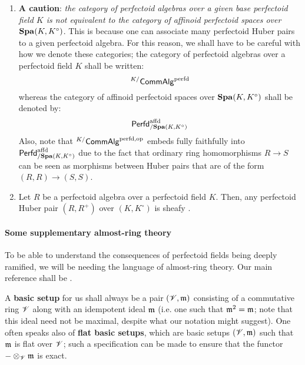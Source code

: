                     \begin{remark} \label{remark: perfectoid_affinoids}
                        \noindent
                        \begin{enumerate}
                            \item \textbf{A caution}: \textit{the category of perfectoid algebras over a given base perfectoid field $K$ is not equivalent to the category of affinoid perfectoid spaces over $\mathbf{Spa}(K, K^{\circ})$}. This is because one can associate many perfectoid Huber pairs to a given perfectoid algebra. For this reason, we shall have to be careful with how we denote these categories; the category of perfectoid algebras over a perfectoid field $K$ shall be written:
                                $${}^{K/}\mathsf{Comm}\mathsf{Alg}^{\mathrm{perfd}}$$
                            whereas the category of affinoid perfectoid spaces over $\mathbf{Spa}(K, K^{\circ})$ shall be denoted by:
                                $$\mathsf{Perfd}^{\mathrm{affd}}_{/\mathbf{Spa}(K, K^{\circ})}$$
                            Also, note that ${}^{K/}\mathsf{Comm}\mathsf{Alg}^{\mathrm{perfd}, \mathrm{op}}$ embeds fully faithfully into $\mathsf{Perfd}^{\mathrm{affd}}_{/\mathbf{Spa}(K, K^{\circ})}$ due to the fact that ordinary ring homomorphisms $R \to S$ can be seen as morphisms between Huber pairs that are of the form $(R, R) \to (S, S)$.
                            \item Let $R$ be a perfectoid algebra over a perfectoid field $K$. Then, any perfectoid Huber pair $(R, R^+)$ over $(K, K^{\circ})$ is sheafy \cite[Theorem 6.3]{scholze2011perfectoid}.
                        \end{enumerate}
                    \end{remark}
                    
                \paragraph{Some supplementary almost-ring theory}
                    To be able to understand the consequences of perfectoid fields being deeply ramified, we will be needing the language of almost-ring theory. Our main reference shall be \cite[Chapter 14]{gabber_ramero_almost_ring_theory}.
                    
                    \begin{convention} \label{conv: basic_setups}
                        A \textbf{basic setup} for us shall always be a pair $(\mathscr{V}, \mathfrak{m})$ consisting of a commutative ring $\mathscr{V}$ along with an idempotent ideal $\mathfrak{m}$ (i.e. one such that $\mathfrak{m}^2 = \mathfrak{m}$; note that this ideal need not be maximal, despite what our notation might suggest). One often speaks also of \textbf{flat basic setups}, which are basic setups $(\mathscr{V}, \mathfrak{m})$ such that $\mathfrak{m}$ is flat over $\mathscr{V}$; such a specification can be made to ensure that the functor $- \tensor_{\scrV} \m$ is exact.
                    \end{convention}
                    
